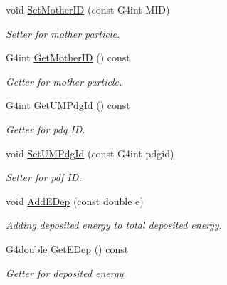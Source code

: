 \begin{DoxyCompactItemize}
void \hyperlink{classUMHit_aa42edfe14f74310860d159eb4274a53c}{Set\+Mother\+I\+D} (const G4int M\+I\+D)
\begin{DoxyCompactList}\small\item\em Setter for mother particle. \end{DoxyCompactList}\item 
G4int \hyperlink{classUMHit_af9e683061a4dae1139102374b5a83283}{Get\+Mother\+I\+D} () const 
\begin{DoxyCompactList}\small\item\em Getter for mother particle. \end{DoxyCompactList}\item 
G4int \hyperlink{classUMHit_ad4c59e6ba7a5a0bc68d36d8b75f3b6c0}{Get\+U\+M\+Pdg\+Id} () const 
\begin{DoxyCompactList}\small\item\em Getter for pdg I\+D. \end{DoxyCompactList}\item 
void \hyperlink{classUMHit_a57b8887426a1eb3f888025c2408596f6}{Set\+U\+M\+Pdg\+Id} (const G4int pdgid)
\begin{DoxyCompactList}\small\item\em Setter for pdf I\+D. \end{DoxyCompactList}\item 
void \hyperlink{classUMHit_ad8f0847257537f21f4758459f5fa3dbd}{Add\+E\+Dep} (const double e)
\begin{DoxyCompactList}\small\item\em Adding deposited energy to total deposited energy. \end{DoxyCompactList}\item 
G4double \hyperlink{classUMHit_a1196b569b6874732e58dabb8ef49a567}{Get\+E\+Dep} () const 
\begin{DoxyCompactList}\small\item\em Getter for deposited energy. \end{DoxyCompactList}\end{DoxyCompactItemize}
